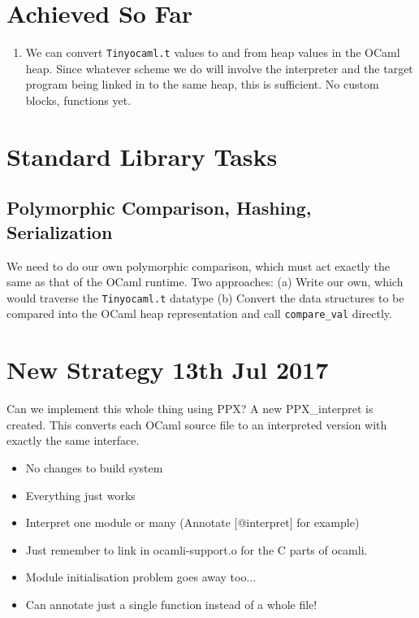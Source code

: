 \documentclass[10pt]{article}
\begin{document}
\section*{Achieved So Far}

\begin{enumerate}
\item We can convert \texttt{Tinyocaml.t} values to and from heap values in the OCaml heap. Since whatever scheme we do will involve the interpreter and the target program being linked in to the same heap, this is sufficient. No custom blocks, functions yet.
\end{enumerate}

\section*{Standard Library Tasks}

\subsection*{Polymorphic Comparison, Hashing, Serialization}

We need to do our own polymorphic comparison, which must act exactly the same as that of the OCaml runtime. Two approaches: (a) Write our own, which would traverse the \texttt{Tinyocaml.t} datatype (b) Convert the data structures to be compared into the OCaml heap representation and call \texttt{compare\_val} directly.

\section*{New Strategy 13th Jul 2017}

Can we implement this whole thing using PPX? A new \textsf{PPX\_interpret} is created. This converts each OCaml source file to an interpreted version with exactly the same interface.

\begin{itemize}
\item No changes to build system
\item Everything just works
\item Interpret one module or many (Annotate [@interpret] for example)
\item Just remember to link in ocamli-support.o for the C parts of ocamli.
\item Module initialisation problem goes away too...
\item Can annotate just a single function instead of a whole file!
\end{itemize}
\end{document}
